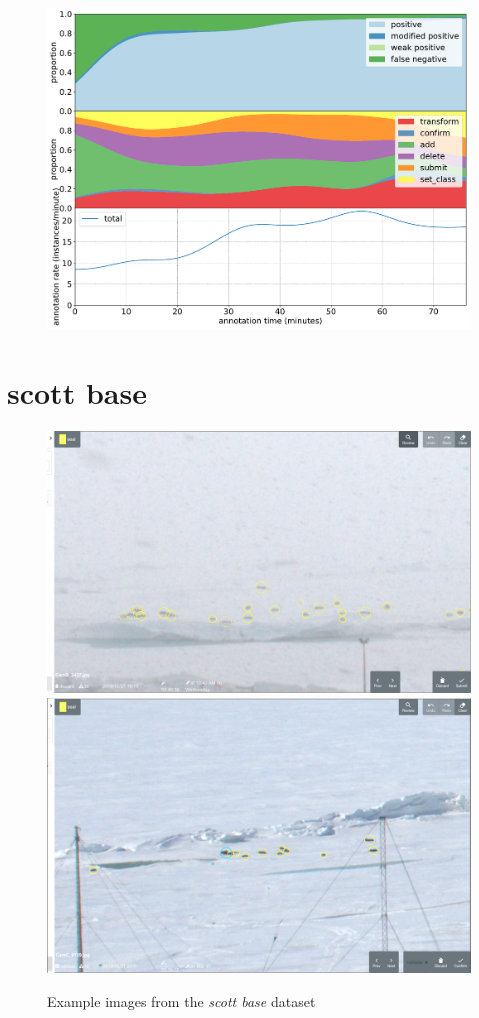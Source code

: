 \begin{figure}[!h]
\centering
\includegraphics[width=1.0\linewidth]{charts/action_annotations/seals2.pdf}
\caption{  }
\label{fig:seals2_annotation}
\end{figure}

\pagebreak
\section {scott base}
\label{sec:scott_base_details}


\begin{figure}[!h]
\centering
  \includegraphics[width=0.475\linewidth]{figures/annotation/screenshots/scott_base_storm.png}
  \hfill
  \includegraphics[width=0.45\linewidth]{figures/annotation/screenshots/scott_base_sunny.png}
  \caption{}
\caption{ Example images from the \emph{scott base} dataset}
\label {fig:scott_base_examples}
\end{figure}


